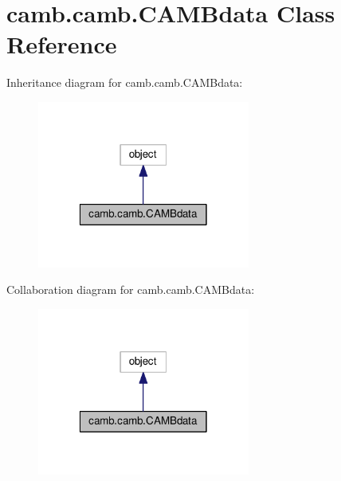 \hypertarget{classcamb_1_1camb_1_1CAMBdata}{}\section{camb.\+camb.\+C\+A\+M\+Bdata Class Reference}
\label{classcamb_1_1camb_1_1CAMBdata}


Inheritance diagram for camb.\+camb.\+C\+A\+M\+Bdata\+:
\nopagebreak
\begin{figure}[H]
\begin{center}
\leavevmode
\includegraphics[width=198pt]{classcamb_1_1camb_1_1CAMBdata__inherit__graph}
\end{center}
\end{figure}


Collaboration diagram for camb.\+camb.\+C\+A\+M\+Bdata\+:
\nopagebreak
\begin{figure}[H]
\begin{center}
\leavevmode
\includegraphics[width=198pt]{classcamb_1_1camb_1_1CAMBdata__coll__graph}
\end{center}
\end{figure}
